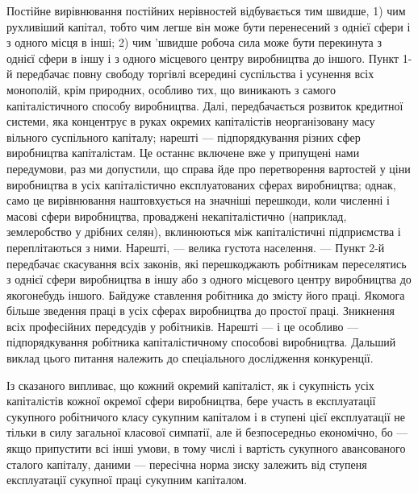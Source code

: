 Постійне вирівнювання постійних нерівностей відбувається
тим швидше, 1) чим рухливіший капітал, тобто чим легше він
може бути перенесений з однієї сфери і з одного місця в інші;
2) чим 'швидше робоча сила може бути перекинута з однієї
сфери в іншу і з одного місцевого центру виробництва до
іншого. Пункт 1-й передбачає повну свободу торгівлі всередині
суспільства і усунення всіх монополій, крім природних, особливо
тих, що виникають з самого капіталістичного способу виробництва.
Далі, передбачається розвиток кредитної системи, яка
концентрує в руках окремих капіталістів неорганізовану масу
вільного суспільного капіталу; нарешті — підпорядкування різних
сфер виробництва капіталістам. Це останнє включене вже
у припущені нами передумови, раз ми допустили, що справа
йде про перетворення вартостей у ціни виробництва в усіх капіталістично
експлуатованих сферах виробництва; однак, само
це вирівнювання наштовхується на значніші перешкоди, коли
численні і масові сфери виробництва, проваджені некапіталістично
(наприклад, землеробство у дрібних селян), вклинюються
між капіталістичні підприємства і переплітаються з ними. Нарешті,
— велика густота населення. — Пункт 2-й передбачає скасування
всіх законів, які перешкоджають робітникам переселятись
з однієї сфери виробництва в іншу або з одного місцевого
центру виробництва до якогонебудь іншого. Байдуже ставлення
робітника до змісту його праці. Якомога більше зведення праці
в усіх сферах виробництва до простої праці. Зникнення всіх професійних
передсудів у робітників. Нарешті — і це особливо —
підпорядкування робітника капіталістичному способові виробництва.
Дальший виклад цього питання належить до спеціального
дослідження конкуренції.

Із сказаного випливає, що кожний окремий капіталіст, як
і сукупність усіх капіталістів кожної окремої сфери виробництва,
бере участь в експлуатації сукупного робітничого класу сукупним
капіталом і в ступені цієї експлуатації не тільки в силу
загальної класової симпатії, але й безпосередньо економічно,
бо — якщо припустити всі інші умови, в тому числі і вартість
сукупного авансованого сталого капіталу, даними — пересічна
норма зиску залежить від ступеня експлуатації сукупної
праці сукупним капіталом.

